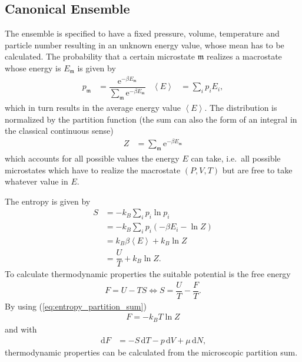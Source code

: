 \documentclass[a4paper,10pt]{article}
\newcommand{\td}{\,\text{d}}
\numberwithin{equation}{section}
\begin{document}
\begin{multicols}{2}
\subsection{Canonical Ensemble}
The ensemble is specified to have a fixed pressure, volume, temperature and particle number resulting in an unknown energy value, whose mean has to be calculated.
The probability that a certain microstate $\mathfrak{m}$ realizes a macrostate whose energy is $E_\mathfrak{m}$ is given by
\begin{align} 
  p_\mathfrak{m} &= \dfrac{\text{e}^{-\beta E_\mathfrak{m} }}{\sum_{\mathfrak{m}}^{}\text{e}^{-\beta E_\mathfrak{m} }} & \left\langle E\right\rangle &=\sum_{i}^{}p_iE_i
,\end{align} 
which in turn results in the average energy value $\left\langle E\right\rangle $.
The distribution is normalized by the partition function (the sum can also the form of an integral in the classical continuous sense)
\begin{align} 
  Z &= \sum_{\mathfrak{m}}^{}\text{e}^{-\beta E_\mathfrak{m}}
\end{align} 
which accounts for all possible values the energy $E$ can take, i.e.\ all possible microstates which have to realize the macrostate $\left(P,V,T\right)$ but are free to take whatever value in $E$.

The entropy is given by
\begin{align} 
  S &= -k_B\sum_{i}^{}p_i\ln p_i\\
    &= -k_B\sum_{i}^{}p_i\left(-\beta E_i-\ln Z\right)\\
    &= k_B\beta \left\langle E\right\rangle +k_B\ln Z\\
    &= \dfrac{U}{T}+k_B\ln Z \label{eq:entropy_partition_sum}
.\end{align} 
To calculate thermodynamic properties the suitable potential is the free energy 
\begin{align} 
  F=U-TS \Leftrightarrow S=\dfrac{U}{T}-\dfrac{F}{T}
.\end{align} 
By using (\ref{eq:entropy_partition_sum})
\begin{align} 
  \boxed{F=-k_BT\ln Z}
\end{align} 
and with
\begin{align} 
  \td F &= -S\td T-p\td V+\mu \td N
,\end{align} 
thermodynamic properties can be calculated from the microscopic partition sum.


\end{multicols}
\end{document}
